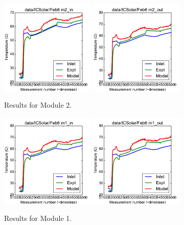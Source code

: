 \documentclass{article}
\begin{document}
\clearpage
\begin{figure}[!ht]
\centering
\includegraphics[width=0.4\textwidth]{../../data/ICSolar/images/Feb6_m2_in_unsteady.pdf}\hspace{0.05\textwidth}
\includegraphics[width=0.4\textwidth]{../../data/ICSolar/images/Feb6_m2_out_unsteady.pdf}\hspace{0.05\textwidth}\\
\caption{Results for Module 2.}\end{figure}
\begin{figure}[!ht]
\centering
\includegraphics[width=0.4\textwidth]{../../data/ICSolar/images/Feb6_m1_in_unsteady.pdf}\hspace{0.05\textwidth}
\includegraphics[width=0.4\textwidth]{../../data/ICSolar/images/Feb6_m1_out_unsteady.pdf}\hspace{0.05\textwidth}\\
\caption{Results for Module 1.}\end{figure}
\end{document}
